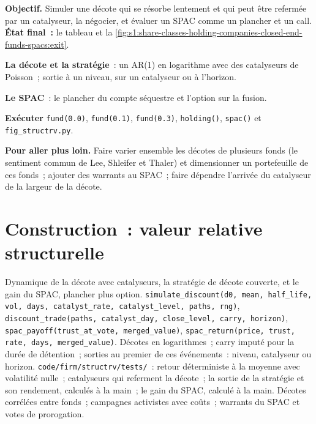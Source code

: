 \begin{tutorial}
\textbf{Objectif.} Simuler une décote qui se résorbe lentement et qui peut être refermée par un catalyseur, la négocier, et évaluer un SPAC comme un plancher et un call. \textbf{État final~:}
le tableau et la \cref{fig:s1:share-classes-holding-companies-closed-end-funds-spacs:exit}.
\begin{tutsteps}
\item \textbf{La décote et la stratégie}~: un AR(1) en logarithme avec des catalyseurs de Poisson~; sortie à un niveau, sur un catalyseur ou à l'horizon.
\label{lst:s1:share-classes-holding-companies-closed-end-funds-spacs:discount}
\item \textbf{Le SPAC}~: le plancher du compte séquestre et l'option sur la fusion.
\label{lst:s1:share-classes-holding-companies-closed-end-funds-spacs:spac}
\item \textbf{Exécuter} \texttt{fund(0.0)}, \texttt{fund(0.1)}, \texttt{fund(0.3)}, \texttt{holding()}, \texttt{spac()} et \texttt{fig\_structrv.py}.
\end{tutsteps}
\textbf{Pour aller plus loin.} Faire varier ensemble les décotes de plusieurs fonds (le sentiment commun de Lee, Shleifer et Thaler) et dimensionner un portefeuille de ces fonds~; ajouter
des warrants au SPAC~; faire dépendre l'arrivée du catalyseur de la largeur de la décote.
\end{tutorial}

\section{Construction~: valeur relative structurelle}\label{bld:s1:share-classes-holding-companies-closed-end-funds-spacs:structrv}

\begin{build}
 Dynamique de la décote avec catalyseurs, la stratégie de décote couverte, et le gain du SPAC, plancher plus option.
 \texttt{simulate\_discount(d0, mean, half\_life, vol, days, catalyst\_rate, catalyst\_level, paths, rng)},
\texttt{discount\_trade(paths, catalyst\_day, close\_level, carry, horizon)}, \texttt{spac\_payoff(trust\_at\_vote, merged\_value)},
\texttt{spac\_return(price, trust, rate, days, merged\_value)}.
 Décotes en logarithmes~; carry imputé pour la durée de détention~; sorties au premier de ces événements~: niveau, catalyseur ou horizon.
 \texttt{code/firm/structrv/tests/}~: retour déterministe à la moyenne avec volatilité nulle~; catalyseurs qui referment la décote~; la sortie de la
stratégie et son rendement, calculés à la main~; le gain du SPAC, calculé à la main.
 Décotes corrélées entre fonds~; campagnes activistes avec coûts~; warrants du SPAC et votes de prorogation.
\end{build}

